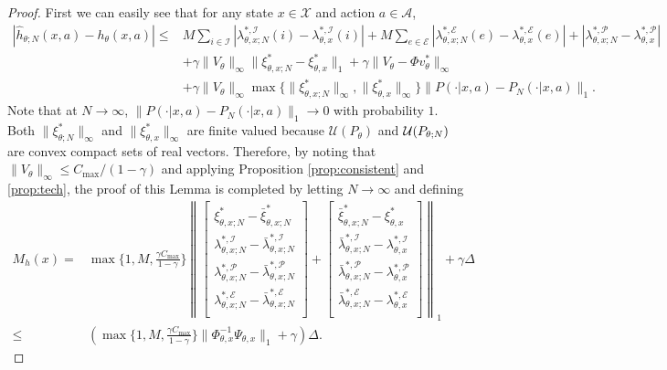 \begin{proof}
First we can easily see that for any state $x\in\mathcal X$ and action $a\in\mathcal A$,
\[
\begin{split}
|\widehat{h}_{\theta;N}(x,a)-{h}_\theta(x,a)|\leq &M\sum_{i\in\mathcal I}\left|\lambda^{*,\mathcal I}_{\theta,x;N}(i)-{\lambda}^{*,\mathcal I}_{\theta,x}(i)\right|+M\sum_{e\in\mathcal E}\left|\lambda^{*,\mathcal E}_{\theta,x;N}(e)-{\lambda}^{*,\mathcal E}_{\theta,x}(e)\right|+\left|\lambda^{*,\mathcal P}_{\theta,x;N}-{\lambda}^{*,\mathcal P}_{\theta,x}\right|\\
&+\gamma\|V_\theta\|_\infty\|\xi^*_{\theta,x;N}-{\xi}^*_{\theta,x}\|_1+\gamma\|V_\theta-\Phi v_\theta^*\|_\infty\\
&+\gamma\|V_\theta\|_\infty\max\{\|\xi^*_{\theta,x;N}\|_\infty,\|{\xi}^*_{\theta,x}\|_\infty\}\|P(\cdot|x,a)-P_N(\cdot|x,a)\|_1.
\end{split}
\]
Note that at $N\rightarrow \infty$, $\|P(\cdot|x,a)-P_N(\cdot|x,a)\|_1\rightarrow 0$ with probability $1$. Both $\|\xi^*_{\theta;N}\|_\infty$ and $\|{\xi}^*_{\theta,x}\|_\infty$ are finite valued because $\mathcal U(P_\theta)$ and $\mathcal U(P_{\theta;N})$ are convex compact sets of real vectors.
Therefore, by noting that $\|V_\theta\|_\infty\leq C_{\max}/(1-\gamma)$ and applying Proposition \ref{prop:consistent} and \ref{prop:tech}, the proof of this Lemma is completed by letting $N\rightarrow \infty$ and defining
\[
\begin{split}
M_h(x)=&\max\{1,M,\frac{\gamma C_{\max}}{1-\gamma}\}\left\|\begin{bmatrix}
\xi^*_{\theta,x;N}-\bar{\xi}^*_{\theta,x;N}\\
\lambda^{*,\mathcal I}_{\theta,x;N}-\bar{\lambda}^{*,\mathcal I}_{\theta,x;N}\\
\lambda^{*,\mathcal P}_{\theta,x;N}-\bar{\lambda}^{*,\mathcal P}_{\theta,x;N}\\
\lambda^{*,\mathcal E}_{\theta,x;N}-\bar{\lambda}^{*,\mathcal E}_{\theta,x;N}\\
\end{bmatrix}+\begin{bmatrix}
\bar\xi^*_{\theta,x;N}-{\xi}^*_{\theta,x}\\
\bar\lambda^{*,\mathcal I}_{\theta,x;N}-{\lambda}^{*,\mathcal I}_{\theta,x}\\
\bar\lambda^{*,\mathcal P}_{\theta,x;N}-{\lambda}^{*,\mathcal P}_{\theta,x}\\
\bar\lambda^{*,\mathcal E}_{\theta,x;N}-{\lambda}^{*,\mathcal E}_{\theta,x}\\
\end{bmatrix}\right\|_1+\gamma\Delta\\
\leq&\left(\max\{1,M,\frac{\gamma C_{\max}}{1-\gamma}\}\|\Phi_{\theta,x}^{-1}\Psi_{\theta,x}\|_1+\gamma\right)\Delta.
\end{split}
\]
\end{proof}
